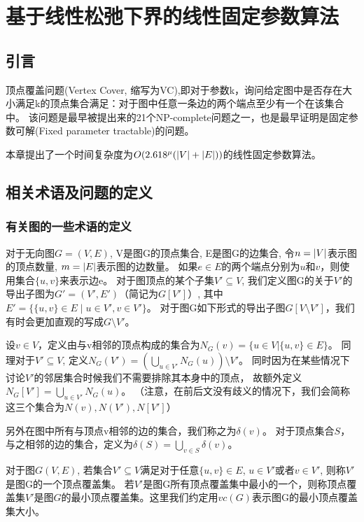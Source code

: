 \chapter{基于线性松弛下界的线性固定参数算法}
\section{引言}
顶点覆盖问题(Vertex Cover, 缩写为VC),即对于参数k，询问给定图中是否存在大小满足k的顶点集合满足：对于图中任意一条边的两个端点至少有一个在该集合中。
该问题是最早被提出来的21个NP-complete问题之一\cite{karp1972reducibility}，也是最早证明是固定参数可解(Fixed parameter tractable)的问题\cite{downey2012parameterized}。

本章提出了一个时间复杂度为$O(2.618^{\mu}(\left\vert V \right\vert + \left\vert E \right\vert))$的线性固定参数算法。

\section{相关术语及问题的定义}
\subsection{有关图的一些术语的定义}
对于无向图$G=(V,E)$, V是图G的顶点集合, E是图G的边集合, 令$n = \left\vert V \right\vert$表示图的顶点数量, $m = \left\vert E \right\vert$表示图的边数量。
如果$e \in E$的两个端点分别为$u$和$v$，则使用集合$\{u, v \}$来表示边e。
对于图顶点的某个子集$V' \subseteq V$, 我们定义图G的关于$V'$的导出子图为$G' = (V', E')$（简记为$G[V']$）, 其中$E' = \{\{u, v\} \in E\;|\;u \in V', v \in V' \}$。
对于图G如下形式的导出子图$G[V \setminus V']$，我们有时会更加直观的写成$G \setminus V'$。

设$v \in V$，定义由与v相邻的顶点构成的集合为$N_{G}(v) = \{ u \in V | \{u, v\} \in E\}$。
同理对于$V' \subseteq V$, 定义$N_{G}(V') = (\bigcup_{u \in V'}N_{G}(u)) \setminus V' $。
同时因为在某些情况下讨论$V'$的邻居集合时候我们不需要排除其本身中的顶点，
故额外定义$N_{G}[V'] = \bigcup_{u \in V'}N_{G}(u)$。
（注意，在前后文没有歧义的情况下，我们会简称这三个集合为$N(v), N(V'),N[V']$）

另外在图中所有与顶点v相邻的边的集合，我们称之为$\delta(v)$。
对于顶点集合$S$，与之相邻的边的集合，定义为$\delta(S) = \bigcup_{v \in S}\delta(v)$。

\begin{definition}[顶点覆盖集]
对于图$G(V, E)$, 若集合$V' \subseteq V$满足对于任意$\{u, v\} \in E$, $u \in V'$或者$v \in V'$, 则称$V'$是图G的一个顶点覆盖集。
若$V'$是图G所有顶点覆盖集中最小的一个，则称顶点覆盖集$V'$是图$G$的最小顶点覆盖集。这里我们约定用$vc(G)$表示图G的最小顶点覆盖集大小。
\end{definition}

